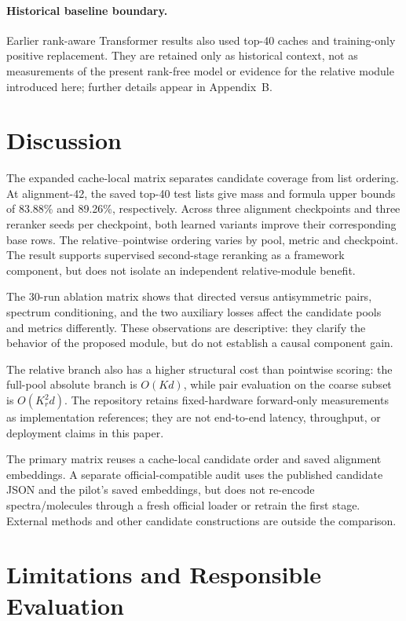 \documentclass[runningheads]{llncs}
\begin{document}
\paragraph{Historical baseline boundary.}
Earlier rank-aware Transformer results also used top-40 caches and
training-only positive replacement. They are retained only as historical
context, not as measurements of the present rank-free model or
evidence for the relative module introduced here; further details appear in
Appendix~B.

\section{Discussion}

The expanded cache-local matrix separates candidate coverage from list ordering.
At alignment-42, the saved top-40 test lists give mass and formula upper bounds
of 83.88\% and 89.26\%, respectively. Across three alignment checkpoints and three
reranker seeds per checkpoint, both learned variants improve their
corresponding base rows. The relative--pointwise ordering varies by pool,
metric and checkpoint. The
result supports supervised second-stage reranking as a framework component,
but does not isolate an independent relative-module benefit.

The 30-run ablation matrix shows that directed versus antisymmetric pairs,
spectrum conditioning, and the two auxiliary losses affect the candidate pools
and metrics differently. These observations are descriptive: they clarify the
behavior of the proposed module, but do not establish a causal component gain.

The relative branch also has a higher structural cost than pointwise scoring:
the full-pool absolute branch is $O(Kd)$, while pair evaluation on the coarse
subset is $O(K_r^2d)$. The repository retains fixed-hardware forward-only
measurements as implementation references; they are not end-to-end latency,
throughput, or deployment claims in this paper.

The primary matrix reuses a cache-local candidate order and saved alignment
embeddings. A separate official-compatible audit uses the published candidate
JSON and the pilot's saved embeddings, but does not re-encode spectra/molecules
through a fresh official loader or retrain the first stage. External methods
and other candidate constructions are outside the comparison.

\section{Limitations and Responsible Evaluation}
\end{document}
